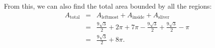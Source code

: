 \documentclass[12pt]{article}
\begin{document}
	From this, we can also find the total area bounded by all the regions:
	$$\begin{array}{rcl}
		A_{\text{total}} 
			& = & A_{\text{leftmost}} + A_{\text{inside}} + A_{\text{sliver}} \\[6mm]
			& = & \frac{9\sqrt{3}}{2}+2\pi + 7\pi-\frac{9\sqrt{3}}{2} + \frac{9\sqrt{3}}{2}-\pi \\[6mm]
			& = & \frac{9\sqrt{3}}{2}+8\pi.
	\end{array}$$
		
\end{document}
